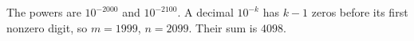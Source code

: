 The powers are $10^{-2000}$ and $10^{-2100}$. A decimal $10^{-k}$ has $k-1$ zeros before its first nonzero digit, so $m=1999$, $n=2099$. Their sum is $\boxed{4098}$.
